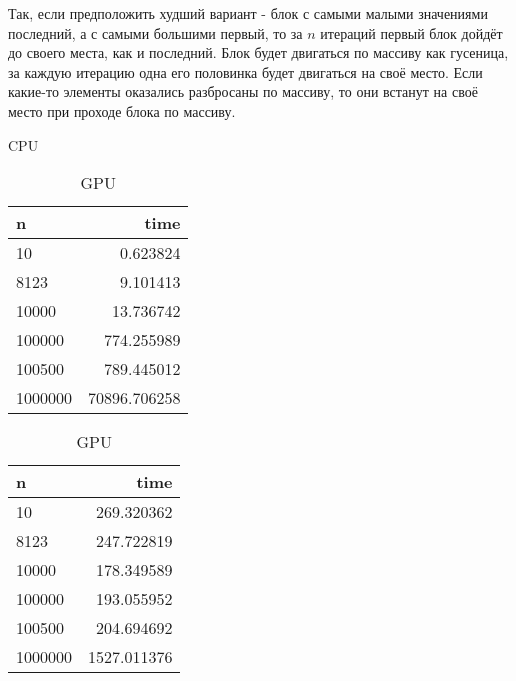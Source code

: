 \documentclass[12pt]{article}
\begin{document}
Так, если предположить худший вариант - блок с самыми малыми значениями последний, а с самыми большими первый,
то за $n$ итераций первый блок дойдёт до своего места, как и последний.
Блок будет двигаться по массиву как гусеница, за каждую итерацию одна его половинка будет двигаться на своё место.
Если какие-то элементы оказались разбросаны по массиву, то они встанут на своё место при проходе блока по массиву.

{
}

\newpage


\begin{table}[!htb]
\begin{minipage}{.49\linewidth}
\centering
\caption*{CPU}
\begin{tabular}{|l|r|}
	\hline
	n       & time         \\
	\hline

	10      & 0.623824     \\
	8123    & 9.101413     \\
	10000   & 13.736742    \\
	100000  & 774.255989   \\
	100500  & 789.445012   \\
	1000000 & 70896.706258 \\
	\hline
\end{tabular}
\end {minipage} %
\begin{minipage}{.49\linewidth}
\centering
\caption*{GPU}
\begin{tabular}{|l|r|}
	\hline
	n       & time        \\
	\hline

	10      & 269.320362  \\
	8123    & 247.722819  \\
	10000   & 178.349589  \\
	100000  & 193.055952  \\
	100500  & 204.694692  \\
	1000000 & 1527.011376 \\
	\hline
\end{tabular}
\end {minipage}
\end{table}


\end{document}
